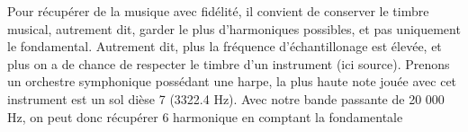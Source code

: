Pour récupérer de la musique avec fidélité, il convient de conserver le timbre musical, autrement dit, garder le plus d'harmoniques possibles, et pas uniquement le fondamental. Autrement dit, plus la fréquence d'échantillonage est élevée, et plus on a de chance de respecter le timbre d'un instrument (ici source). Prenons un orchestre symphonique possédant une harpe, la plus haute note jouée avec cet instrument est un sol dièse 7 (3322.4 Hz). Avec notre bande passante de 20 000 Hz, on peut donc récupérer 6 harmonique en comptant la fondamentale